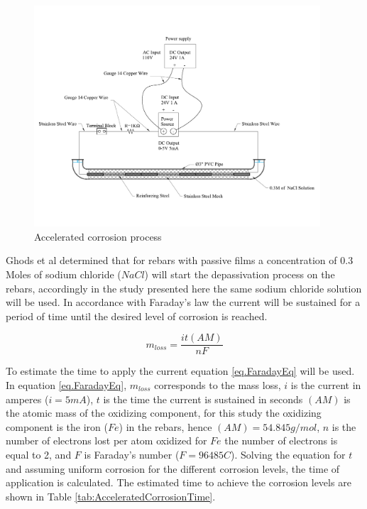 \begin{figure}[htbp]
	\centering
	\includegraphics[width=0.95\textwidth]{Chapter-3/figs/AcceleratedCorrosionProcedure}
	\caption{Accelerated corrosion process}
	\label{fig:AcceleratedCorrosion}
\end{figure}

Ghods et al \cite{Ghods2010} determined that for rebars with passive films a concentration of 0.3 Moles of sodium chloride ($NaCl$) will start the depassivation process on the rebars, accordingly in the study presented here the same sodium chloride solution will be used. In accordance with Faraday's law the current will be sustained for a period of time until the desired level of corrosion is reached.

\begin{equation}
	m_{loss}=\frac{it(AM)}{nF}
	\label{eq.FaradayEq}
\end{equation}

To estimate the time to apply the current equation \ref{eq.FaradayEq} will be used. In equation \ref{eq.FaradayEq}, $m_{loss}$ corresponds to the mass loss, $i$ is the current in amperes ($i=5 mA$), $t$ is the time the current is sustained in seconds $(AM)$ is the atomic mass of the oxidizing component, for this study the oxidizing component is the iron ($Fe$) in the rebars, hence $(AM)=54.845g/mol$, $n$ is the number of electrons lost per atom oxidized for $Fe$ the number of electrons is equal to 2, and $F$ is Faraday's number ($F=96485 C$). Solving the equation for $t$ and assuming uniform corrosion for the different corrosion levels, the time of application is calculated. The estimated time to achieve the corrosion levels are shown in Table \ref{tab:AcceleratedCorrosionTime}. 

